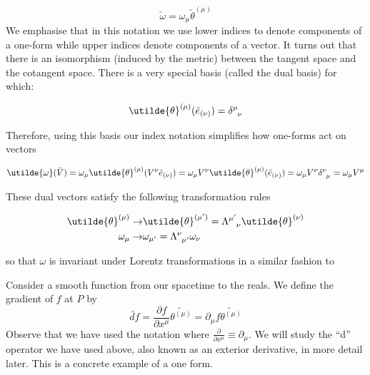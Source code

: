 \documentclass[11pt]{article}
\theoremstyle{plain}
\begin{document}
\begin{equation}
\utilde{\omega} = \omega_{\mu} \utilde{\theta}^{(\mu)}
\end{equation}
We emphasise that in this notation we use lower indices to denote components of a one-form while upper indices denote components of a vector. It turns out that there is an isomorphism (induced by the metric) between the tangent space and the cotangent space. There is a very special basis (called the dual basis) for which: 

\begin{equation}
\utilde{\theta}^{(\mu)} (\bar{e}_{(\nu)}) = \tensor{\delta}{^\mu_\nu}
\end{equation}


Therefore, using this basis our index notation simplifies how one-forms act on vectors

\begin{equation}
\utilde{\omega} (\bar{V}) =\omega_{\mu} \utilde{\theta}^{(\mu)} (  V^{\nu} \bar{e}_{(\nu)} ) = \omega_{\mu} V^{\nu} \utilde{\theta}^{(\mu)} (\bar{e}_{(\nu)} ) = \omega_{\mu} V^{\nu} \tensor{\delta}{^\nu_\mu} =  \omega_{\mu} V^{\mu}
\end{equation}

These dual vectors satisfy the following transformation rules

\begin{align}
\utilde{\theta}^{(\mu)} \rightarrow &  \utilde{\theta}^{(\mu')} = \tensor{\Lambda}{^{\mu '}_{\nu}} \utilde{\theta}^{(\nu)}   \\
\omega_{\mu } \rightarrow &  \omega_{\mu '} = \tensor{\Lambda}{^\nu_{\mu '}} \omega_{\nu }
\end{align}


so that $\omega$ is invariant under Lorentz transformations in a similar fashion to 

\begin{example}
Consider a smooth function from our spacetime to the reals. We define the gradient of $f$ at $P$ by
\begin{equation}
\utilde{d f} = \frac{\partial f}{\partial x^{\mu}} \utilde{\theta^{(\mu)}} =  \partial_{\mu} f  \utilde{\theta^{(\mu)}} 
\end{equation}
Observe that we have used the notation where  $\frac{\partial}{\partial x^{\mu}} \equiv \partial_{\mu}$. We will study the “d” operator we have used above, also known as an exterior derivative, in more detail later. This is a concrete example of a one form.
\end{example}
\end{document}
